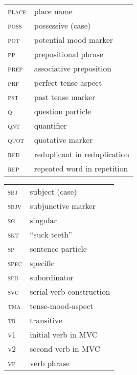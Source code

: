 \newpage 
\begin{tabularx}{.45\textwidth}{lQ}
\textsc{place} & place name\\
\textsc{poss} & possessive (case)\\
\textsc{pot} & potential mood marker\\
\textsc{pp} & prepositional phrase\\
\textsc{prep} & associative preposition\\
\textsc{prf} & perfect tense-aspect\\
\textsc{pst} & past tense marker\\
\textsc{q} & question particle\\
\textsc{qnt} & quantifier\\
\textsc{quot} & quotative marker\\
\textsc{red} & reduplicant in reduplication\\
\textsc{rep} & repeated word in repetition\\
\end{tabularx}
\begin{tabularx}{.45\textwidth}{lQ}
\textsc{sbj} & subject (case)\\
\textsc{sbjv} & subjunctive marker\\
\textsc{sg} & singular\\
\textsc{skt} & “suck teeth”\\
\textsc{sp} & sentence particle\\
\textsc{spec} & specific\\
\textsc{sub} & subordinator\\
\textsc{svc} & serial verb construction\\
\textsc{tma} & tense-mood-aspect\\
\textsc{tr} & transitive\\
\textsc{v1} & initial verb in \textsc{MVC}\\
\textsc{v2} & second verb in \textsc{MVC}\\
\textsc{vp} & verb phrase\\
\end{tabularx}